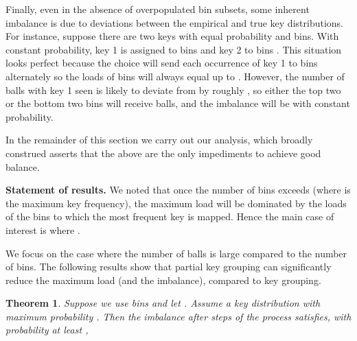\documentclass[10pt,conference,letterpaper]{IEEEtran}
\newcommand{\spara}[1]{\smallskip\noindent\textbf{#1}}
\newcommand{\mycomment}[1]{}
\newtheorem{theorem}{Theorem}[section]
\begin{document}
Finally, even in the absence of overpopulated bin subsets, some inherent imbalance
is     due to deviations between the empirical and true key distributions.
For instance, suppose there are two
keys  with equal probability  and  bins. With constant probability, key 1 is assigned to bins 
and key 2 to bins . This situation looks perfect because the  choice will send each
occurrence of key 1 to bins  alternately so the loads of bins  will always equal up to .
However, the number of balls with key 1 seen is likely to deviate from  by roughly , so either the top two or the bottom two bins will receive
 balls, and the imbalance will be  with constant probability.

In the remainder of this section we carry out our analysis, which broadly construed asserts that the above are the only impediments to achieve good balance. 

\spara{Statement of results.}
We  noted  that once the number of bins exceeds  (where  is the maximum key
frequency), the maximum load will be dominated by the loads of the bins to which the most frequent key is mapped. 
Hence the main case of interest is where .



We focus on the case where the number of balls is large compared to the number of bins. 
The following results show that partial key grouping can significantly reduce the maximum load (and the imbalance), compared to key
grouping.
\begin{theorem}\label{thm:main}
Suppose we use  bins and let .
Assume a key distribution  with maximum probability .
Then
the imbalance after  steps of the  process satisfies, with probability at least ,

\mycomment{
the following hold:
\begin{itemize}
\item For any , the imbalance after  steps of the \code{Greedy-} process satisfies, with probability at least ,

Moreover, with probability at least  over the choice of the  hash functions, any load balancing policy using the same set of
choices for each key must have imbalance
.
\item For some distributions ,
the imbalance after  steps of the \code{Greedy-1} process satisfies, with probability at least ,

\end{itemize}
}
\end{theorem}
\end{document}
